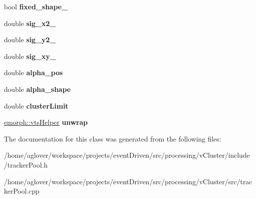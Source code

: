 \begin{DoxyCompactItemize}
\item 
\hypertarget{classTrackerPool_af83ad39640f58a747253b85046083140}{bool {\bfseries fixed\-\_\-shape\-\_\-}}\label{classTrackerPool_af83ad39640f58a747253b85046083140}

\item 
\hypertarget{classTrackerPool_a6a92ea09387253159839324143b6206a}{double {\bfseries sig\-\_\-x2\-\_\-}}\label{classTrackerPool_a6a92ea09387253159839324143b6206a}

\item 
\hypertarget{classTrackerPool_a3181cb8343949ab80181c9028ae114fa}{double {\bfseries sig\-\_\-y2\-\_\-}}\label{classTrackerPool_a3181cb8343949ab80181c9028ae114fa}

\item 
\hypertarget{classTrackerPool_a9018c85457b2616efe8f718f1602b32a}{double {\bfseries sig\-\_\-xy\-\_\-}}\label{classTrackerPool_a9018c85457b2616efe8f718f1602b32a}

\item 
\hypertarget{classTrackerPool_ad67aaae3b2c777330ccb4abb9bf60884}{double {\bfseries alpha\-\_\-pos}}\label{classTrackerPool_ad67aaae3b2c777330ccb4abb9bf60884}

\item 
\hypertarget{classTrackerPool_ad134dda445a2b5eea2d2101a6e5c2132}{double {\bfseries alpha\-\_\-shape}}\label{classTrackerPool_ad134dda445a2b5eea2d2101a6e5c2132}

\item 
\hypertarget{classTrackerPool_a6c9e6cdff31c0ab40c19f54d30d315cc}{double {\bfseries cluster\-Limit}}\label{classTrackerPool_a6c9e6cdff31c0ab40c19f54d30d315cc}

\item 
\hypertarget{classTrackerPool_a81cc371a7b834bdff0dbaa3601a21d14}{\hyperlink{classemorph_1_1vtsHelper}{emorph\-::vts\-Helper} {\bfseries unwrap}}\label{classTrackerPool_a81cc371a7b834bdff0dbaa3601a21d14}

\end{DoxyCompactItemize}


The documentation for this class was generated from the following files\-:\begin{DoxyCompactItemize}
\item 
/home/aglover/workspace/projects/event\-Driven/src/processing/v\-Cluster/include/tracker\-Pool.\-h\item 
/home/aglover/workspace/projects/event\-Driven/src/processing/v\-Cluster/src/tracker\-Pool.\-cpp\end{DoxyCompactItemize}
